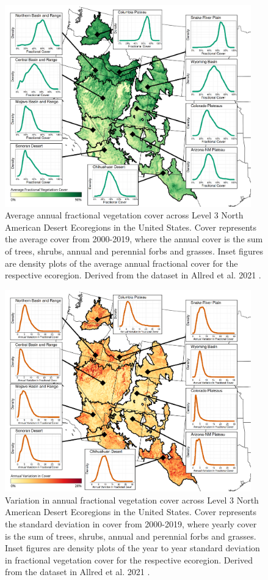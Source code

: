 \documentclass{article}
\begin{document}
\begin{figure}[h]
    \centering
    \includegraphics[width=0.95\textwidth]{figures/fig6_avg_cover.png}
    \caption{Average annual fractional vegetation cover across Level 3 North American Desert Ecoregions in the United States. Cover represents the average cover from 2000-2019, where the annual cover is the sum of trees, shrubs, annual and perennial forbs and grasses. Inset figures are density plots of the average annual fractional cover for the respective ecoregion. Derived from the dataset in Allred et al. 2021 \cite{allred2021}.}
    \label{fig6}
\end{figure}

\begin{figure}[h]
    \centering
    \includegraphics[width=0.95\textwidth]{figures/fig7_std_cover.png}
    \caption{Variation in annual fractional vegetation cover across Level 3 North American Desert Ecoregions in the United States. Cover represents the standard deviation in cover from 2000-2019, where yearly cover is the sum of trees, shrubs, annual and perennial forbs and grasses. Inset figures are density plots of the year to year standard deviation in fractional vegetation cover for the respective ecoregion. Derived from the dataset in Allred et al. 2021 \cite{allred2021}.}
    \label{fig7}
\end{figure}
\end{document}
